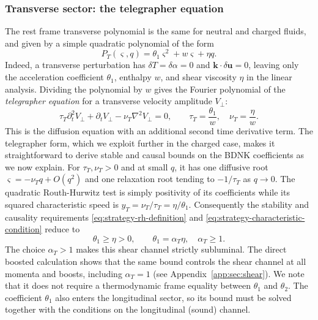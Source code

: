 \subsubsection{Transverse sector: the telegrapher equation}\label{sec:strategy-shear}
The rest frame transverse polynomial is the same for neutral and
charged fluids, and given by a simple quadratic polynomial of the form
\begin{equation}\label{eq:strategy-shear-polynomial}
 P_T(\varsigma,q)=\theta_1\varsigma^2+w\varsigma+\eta q.
\end{equation}
Indeed, a transverse perturbation has $\delta T=\delta\alpha=0$ and
$\mathbf k\cdot\delta\mathbf u=0$, leaving only the acceleration
coefficient $\theta_1$, enthalpy $w$, and shear viscosity $\eta$ in the linear analysis.
Dividing the polynomial by $w$ gives the Fourier polynomial of the
\emph{telegrapher equation} for a transverse velocity amplitude $V_\perp$:
\begin{equation}\label{eq:strategy-telegrapher}
 \tau_T\partial_t^2V_\perp+\partial_tV_\perp-\nu_T\nabla^2V_\perp=0,
 \qquad \tau_T=\frac{\theta_1}{w},\quad \nu_T=\frac{\eta}{w}.
\end{equation}
This is the diffusion equation with an additional second time derivative term. The telegrapher form, which we exploit further in the charged case, makes it straightforward to derive  stable and causal bounds on the BDNK coefficients as we now explain. For
$\tau_T,\nu_T>0$ and at small $q$, it has one diffusive root
$\varsigma=-\nu_Tq+O(q^2)$ and one relaxation root tending to $-1/\tau_T$ as $q\to0$.
The quadratic Routh-Hurwitz test is simply positivity of its coefficients while
its squared characteristic speed is $y_T=\nu_T/\tau_T=\eta/\theta_1$.
Consequently the stability and causality requirements \eqref{eq:strategy-rh-definition} and \eqref{eq:strategy-characteristic-condition} reduce to
\begin{equation}\label{eq:strategy-shear-bound}
 \theta_1\geq\eta>0,
 \qquad \theta_1=\alpha_T\eta,\quad\alpha_T\geq1.
\end{equation}
The choice $\alpha_T>1$ makes this shear channel strictly subluminal. The direct
boosted calculation shows that the same bound controls the shear channel at all
momenta and boosts, including $\alpha_T=1$ (see
Appendix~\ref{app:sec:shear}). We note that it does not require a thermodynamic frame equality between $\theta_1$ and
$\theta_2$. The coefficient $\theta_1$ also enters the longitudinal sector, so its bound must be solved together with the conditions on the longitudinal (sound) channel.


